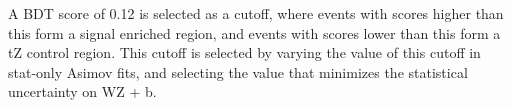 

A BDT score of 0.12 is selected as a cutoff, where events with scores higher than this form a signal enriched region, and events with scores lower than this form a tZ control region. This cutoff is selected by varying the value of this cutoff in stat-only Asimov fits, and selecting the value that minimizes the statistical uncertainty on WZ + b.



